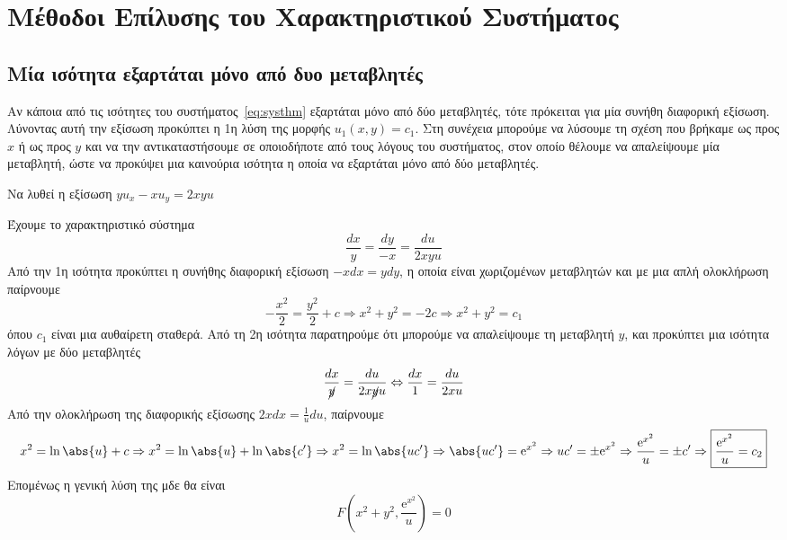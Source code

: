 \section{Μέθοδοι Επίλυσης του Χαρακτηριστικού Συστήματος}

\subsection{Μία ισότητα εξαρτάται μόνο από δυο μεταβλητές}

Αν κάποια από τις ισότητες του συστήματος~\eqref{eq:systhm} εξαρτάται μόνο από 
δύο μεταβλητές, τότε πρόκειται για μία συνήθη διαφορική εξίσωση.
Λύνοντας αυτή την εξίσωση προκύπτει η 1η λύση της μορφής $ u_{1}(x,y)= c_{1} $. 
Στη συνέχεια μπορούμε να λύσουμε τη σχέση που βρήκαμε ως προς $x$ ή ως προς $y$ και 
να την αντικαταστήσουμε σε οποιοδήποτε από τους λόγους του συστήματος, στον οποίο 
θέλουμε να απαλείψουμε μία μεταβλητή, ώστε να προκύψει μια καινούρια ισότητα 
η οποία να  εξαρτάται μόνο από δύο μεταβλητές.

\begin{example}
  Να λυθεί η εξίσωση $ yu_{x}-xu_{y}=2xyu $  
\end{example}
\begin{solution}
  Έχουμε το χαρακτηριστικό σύστημα
  \[
    \frac{dx}{y} = \frac{dy}{-x} = \frac{du}{2xyu} 
  \] 
  Από την 1η ισότητα προκύπτει η συνήθης διαφορική εξίσωση $ -x dx = y dy $, η 
  οποία είναι χωριζομένων μεταβλητών και με μια απλή ολοκλήρωση παίρνουμε 
  \[
    - \frac{x^{2}}{2} = \frac{y^{2}}{2} + c \Rightarrow x^{2}+y^{2}=-2c \Rightarrow
    \boxed{x^{2}+y^{2}= c_{1}}
  \] 
  όπου $ c_{1} $ είναι μια αυθαίρετη σταθερά. Από τη 2η ισότητα παρατηρούμε ότι 
  μπορούμε να απαλείψουμε τη μεταβλητή $y$, και προκύπτει μια ισότητα λόγων με δύο 
  μεταβλητές
  \[
    \frac{dx}{\cancel{y}} = \frac{du}{2x\cancel{y}u} \Leftrightarrow \frac{dx}{1} =
    \frac{du}{2xu} 
  \] 
  Από την ολοκλήρωση της διαφορικής εξίσωσης $2x dx = \frac{1}{u} du$, παίρνουμε
  \[
    x^{2}= \ln{\abs{u}} + c \Rightarrow x^{2}= \ln{\abs{u}} + \ln{\abs{c'}}
    \Rightarrow x^{2}= \ln{\abs{uc'}} \Rightarrow \abs{uc'} = \mathrm{e}^{x^{2}} 
    \Rightarrow uc' = \pm \mathrm{e}^{x^{2}} 
    \Rightarrow \frac{\mathrm{e}^{x^{2}}}{u} = \pm c' \Rightarrow
    \boxed{\frac{\mathrm{e}^{x^{2}}}{u} = c_{2}}
  \] 
  Επομένως η γενική λύση της μδε θα είναι 
  \[
    F\left(x^{2}+y^{2}, \frac{\mathrm{e}^{x^{2}}}{u}\right) = 0
  \] 
\end{solution}



